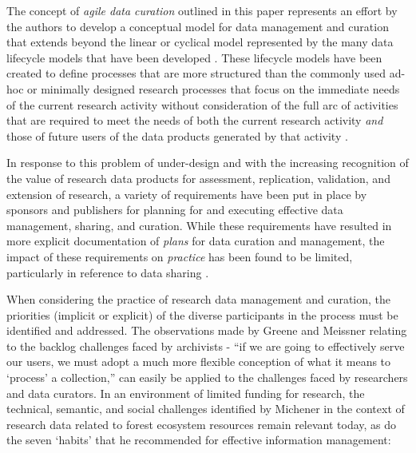 \documentclass[paper]{ijdc-v9}
\begin{document}
The concept of \emph{agile data curation} outlined in this paper
represents an effort by the authors to develop a conceptual model for
data management and curation that extends beyond the linear or cyclical
model represented by the many data lifecycle models that have been
developed
\autocites{ball_review_2012}{park_session_2016}{moller_lifecycle_2013}{working_group_on_information_systems_and_services_data_data_stewardship_interest_group_data_2011}.
These lifecycle models have been created to define processes that are
more structured than the commonly used ad-hoc or minimally designed
research processes that focus on the immediate needs of the current
research activity without consideration of the full arc of activities
that are required to meet the needs of both the current research
activity \emph{and} those of future users of the data products generated
by that activity
\autocites{kervin_common_2013}{white_considering_2010}{tenopir_data_2011}{akers_disciplinary_2013}{kennan_research_2015}{vines_availability_2014}.

In response to this problem of under-design and with the increasing
recognition of the value of research data products for assessment,
replication, validation, and extension of research, a variety of
requirements have been put in place by sponsors
\autocites{office_of_management_and_budget_omb_digital_2012}{office_of_management_and_budget_omb_memorandum_2013}{office_of_management_and_budget_omb_memorandum_2009}{obama_77_2012}{obama_executive_2013}{obama_transparency_2009}
and publishers \autocites{_availability_2016}[
]{public_library_of_science_plos_data_2016} for planning for and
executing effective data management, sharing, and curation. While these
requirements have resulted in more explicit documentation of
\emph{plans} for data curation and management, the impact of these
requirements on \emph{practice} has been found to be limited,
particularly in reference to data sharing \autocite{mauthner_open_2013}.

When considering the practice of research data management and curation,
the priorities (implicit or explicit) of the diverse participants in the
process must be identified and addressed. The observations made by
Greene and Meissner \autocite*{greene_more_2005} relating to the backlog
challenges faced by archivists - ``if we are going to effectively serve
our users, we must adopt a much more flexible conception of what it
means to `process' a collection,'' \autocite[pp.~233]{greene_more_2005}
can easily be applied to the challenges faced by researchers and data
curators. In an environment of limited funding for research, the
technical, semantic, and social challenges identified by Michener
\autocite*{michener_role_1999} in the context of research data related
to forest ecosystem resources remain relevant today, as do the seven
`habits' that he recommended for effective information management:
\end{document}
